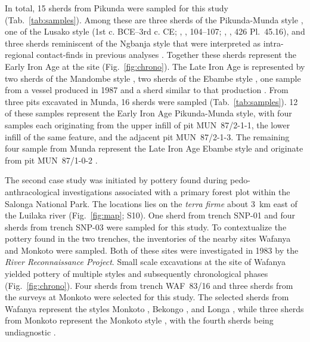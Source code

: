 \documentclass[preprint,10pt,oneside,onecolumn,authoryear]{elsarticle}
\begin{document}
In total, 15 sherds from Pikunda were sampled for this study (Tab.~\ref{tab:samples}). Among these are three sherds of the Pikunda-Munda style \citep[1st c. BCE--4th c. CE;][427 Pl.~46.21, 428 Pl.~47.6, 429 Pl.~48.25]{Seidensticker.2021e}, one of the Lusako style (1st c. BCE--3rd c. CE; \citeauthor{Wotzka.1995}, \citeyear{Wotzka.1995}, 104--107; \citeauthor{Seidensticker.2021e}, \citeyear{Seidensticker.2021e}, 426 Pl.~45.16), and three sherds reminiscent of the Ngbanja style that were interpreted as intra-regional contact-finds in previous analyses \citep[2nd c. BCE--5th c. CE;][82--86, 296 Tab.~34, 428 Pl.~47.19--21]{Seidensticker.2021e}. Together these sherds represent the Early Iron Age at the site (Fig.~\ref{fig:chrono}). The Late Iron Age is represented by two sherds of the Mandombe style \citep[14th--15th c. CE;][145--148]{Seidensticker.2021e}, two sherds of the Ebambe style \citep[16th--20th c. CE;][430 Pl.~49.10]{Seidensticker.2021e}, one sample from a vessel produced in 1987 and a sherd similar to that production \citep[430 Pl.~49.5]{Seidensticker.2021e}. From three pits excavated in Munda, 16 sherds were sampled (Tab.~\ref*{tab:samples}). 12 of these samples represent the Early Iron Age Pikunda-Munda style, with four samples each originating from the upper infill of pit MUN~87/2-1-1, the lower infill of the same feature, and  the adjacent pit MUN~87/2-1-3. The remaining four sample from Munda represent the Late Iron Age Ebambe style and originate from pit MUN~87/1-0-2 \citep[312 Fig.~147]{Seidensticker.2021e}.

The second case study was initiated by pottery found during pedo-anthra\-cological investigations associated with a primary forest plot within the Salonga National Park. The locations lies on the \textit{terra firme} about 3~km east of the Luilaka river (Fig.~\ref{fig:map}; S10). One sherd from trench SNP-01 and four sherds from trench SNP-03 were sampled for this study. To contextualize the pottery found in the two trenches, the inventories of the nearby sites Wafanya and Monkoto were sampled. Both of these sites were investigated in 1983 by the \textit{River Reconnaissance Project}. Small scale excavations at the site of Wafanya \citep[360--368]{Wotzka.1995} yielded pottery of multiple styles and subsequently chronological phases (Fig.~\ref{fig:chrono}). Four sherds from trench WAF~83/16 and three sherds from the surveys at Monkoto were selected for this study. The selected sherds from Wafanya represent the styles Monkoto \citep[1st c. BCE--2nd c. CE;][99; 504 Pl.~70.10]{Wotzka.1995}, Bekongo \citep[8th--10th c. CE;][158--163, 503 Pl.~69.5--6]{Wotzka.1995}, and Longa \citep[11th--14th c. CE;][503 Pl.~69.9]{Wotzka.1995}, while three sherds from Monkoto represent the Monkoto style \citep[504 Pl.~70.10, 506 Pl.~72.5--6]{Wotzka.1995}, with the fourth sherds being undiagnostic \citep[506 Pl.~71.6]{Wotzka.1995}.
\end{document}
